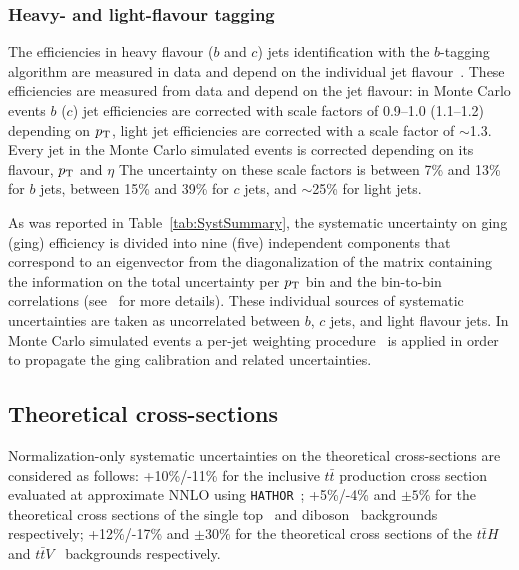 \subsubsection{Heavy- and light-flavour tagging}
\label{sec:syst_btag}


The efficiencies in heavy flavour ($b$ and $c$) jets identification with
the $b$-tagging algorithm are measured in data and depend on the individual
jet flavour~\cite{btagging,ctagging,ltagging}.
These efficiencies are measured from data and depend on the jet flavour:
in Monte Carlo events $b$ ($c$) jet efficiencies are corrected with scale factors
of 0.9--1.0 (1.1--1.2) depending on $\pt$, light jet efficiencies are corrected 
with a  scale factor of $\sim$1.3.
Every jet in the Monte Carlo simulated events is corrected depending
on its flavour, $\pt$ and $\eta$
The uncertainty on these scale factors is 
between 7\% and 13\% for $b$ jets, between 15\% and 39\% for $c$ jets,
and $\sim$25\% for light jets.

As was reported in Table~\ref{tab:SystSummary}, the systematic uncertainty
on \btag ging (\ctag ging) efficiency is divided into nine (five) independent 
components that correspond to an eigenvector from the diagonalization of the
matrix containing the information on the total uncertainty 
per $\pt$ bin and the bin-to-bin correlations (see~\cite[Appendix P]{VHbb} for
more details).
These individual sources of systematic uncertainties 
are taken as uncorrelated between $b$, $c$ jets, and
light flavour jets. In Monte Carlo simulated events 
a per-jet weighting procedure~\cite{IFAEBtagNote}
is applied in order to propagate the \btag ging calibration
and related uncertainties.

\subsection{Theoretical cross-sections}
\label{sec:syst_bkgxsect}

Normalization-only systematic uncertainties on the theoretical
cross-sections are considered as follows:
+10\%/-11\% for the inclusive $t\bar{t}$
production cross section evaluated at approximate NNLO using 
\texttt{HATHOR}~\cite{ttbarxs}; +5\%/-4\% and $\pm 5\%$ 
for the theoretical cross sections of the single
top~\cite{stopxs,stopxs_2} and diboson~\cite{dibosonxs} backgrounds
respectively; +12\%/-17\% and  $\pm 30\%$ 
for the theoretical cross sections of the $t\bar{t}H$~\cite{lhcxs} and 
$t\bar{t}V$~\cite{ttbarVxs1,ttbarVxs2} backgrounds respectively.


